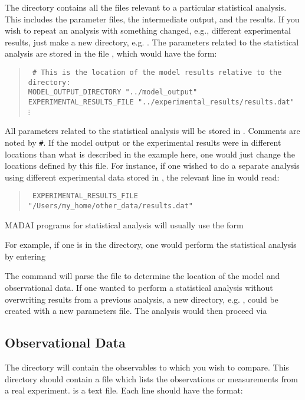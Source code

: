 The  directory contains all the files relevant to a particular statistical analysis. This includes the parameter files, the intermediate output, and the results. If you wish to repeat an analysis with something changed, e.g., different experimental results, just make a new directory, e.g. . The parameters related to the statistical analysis are stored in the file , which would have the form:
\begin{quote}{\tt
	\# This is the location of the model results relative to the  directory:\\
	MODEL\_OUTPUT\_DIRECTORY "../model\_output"\\
    EXPERIMENTAL\_RESULTS\_FILE "../experimental\_results/results.dat"\\
	$\vdots$
	}
\end{quote}
All parameters related to the statistical analysis will be stored in . Comments are noted by {\tt\#}. If the model output or the experimental results were in different locations than what is described in the example here, one would just change the locations defined by this file. For instance, if one wished to do a separate analysis using different experimental data stored in , the relevant line in  would read:

\begin{quote}{\tt
EXPERIMENTAL\_RESULTS\_FILE "/Users/my\_home/other\_data/results.dat"}
\end{quote}
MADAI programs for statistical analysis will usually use the form


For example, if one is in the  directory, one would perform the statistical analysis by entering


The command will parse the file  to determine the location of the model and observational data. If one wanted to perform a statistical analysis without overwriting results from a previous analysis, a new directory, e.g. , could be created with a new parameters file. The analysis would then proceed via


\subsection{Observational Data}
\label{sec:ObservationalData}
The  directory will contain the observables to which you wish to compare. This directory should contain a file  which lists the observations or measurements from a real experiment.  is a text file. Each line should have the format:

